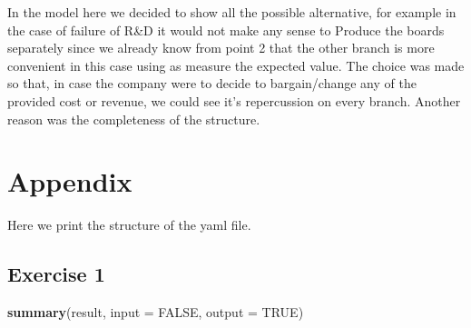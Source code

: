 \documentclass[]{article}
\newenvironment{Shaded}{\begin{snugshade}}{\end{snugshade}}
\newcommand{\KeywordTok}[1]{\textcolor[rgb]{0.13,0.29,0.53}{\textbf{#1}}}
\newcommand{\DataTypeTok}[1]{\textcolor[rgb]{0.13,0.29,0.53}{#1}}
\newcommand{\OtherTok}[1]{\textcolor[rgb]{0.56,0.35,0.01}{#1}}
\newcommand{\NormalTok}[1]{#1}
\begin{document}
In the model here we decided to show all the possible alternative, for
example in the case of failure of R\&D it would not make any sense to
Produce the boards separately since we already know from point 2 that
the other branch is more convenient in this case using as measure the
expected value. The choice was made so that, in case the company were to
decide to bargain/change any of the provided cost or revenue, we could
see it's repercussion on every branch. Another reason was the
completeness of the structure.

\pagebreak

\section{Appendix}\label{appendix}

Here we print the structure of the yaml file.

\subsection{Exercise 1}\label{exercise-1}

\begin{Shaded}
\begin{Highlighting}[]
\KeywordTok{summary}\NormalTok{(result, }\DataTypeTok{input =} \OtherTok{FALSE}\NormalTok{, }\DataTypeTok{output =} \OtherTok{TRUE}\NormalTok{)}
\end{Highlighting}
\end{Shaded}
\end{document}
